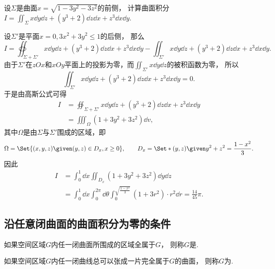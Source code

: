 \begin{example}
设\(\Sigma\)是曲面\(x = \sqrt{1-3y^2-3z^2}\)的前侧，
计算曲面积分\(I = \iint_\Sigma x \dd{y}\dd{z} + (y^3+2) \dd{z}\dd{x} + z^3 \dd{x}\dd{y}\).
\begin{solution}
设\(\Sigma'\)是平面\(x=0,3x^2+3y^2\leq1\)的后侧，
那么\begin{equation*}
	I = \oiint_{\Sigma + \Sigma'} x \dd{y}\dd{z} + (y^3+2) \dd{z}\dd{x} + z^3 \dd{x}\dd{y}
	- \iint_{\Sigma'} x \dd{y}\dd{z} + (y^3+2) \dd{z}\dd{x} + z^3 \dd{x}\dd{y}.
\end{equation*}
由于\(\Sigma'\)在\(zOx\)和\(xOy\)平面上的投影为零，而\(\iint_{\Sigma'} x \dd{y}\dd{z}\)的被积函数为零，
所以\begin{equation*}
	\iint_{\Sigma'} x \dd{y}\dd{z} + (y^3+2) \dd{z}\dd{x} + z^3 \dd{x}\dd{y} = 0.
\end{equation*}
于是由高斯公式可得\begin{align*}
	I &= \oiint_{\Sigma + \Sigma'} x \dd{y}\dd{z} + (y^3+2) \dd{z}\dd{x} + z^3 \dd{x}\dd{y} \\
	&= \iiint_\Omega (1+3y^2+3z^2) \dd{v},
\end{align*}
其中\(\Omega\)是由\(\Sigma\)与\(\Sigma'\)围成的区域，即\begin{equation*}
	\Omega = \Set{ (x,y,z) \given (y,z) \in D_x, x\geq0 },
	\qquad
	D_x = \Set*{ (y,z) \given y^2+z^2 = \frac{1-x^2}3 }.
\end{equation*}
因此\begin{align*}
	I &= \int_0^1 \dd{x} \iint_{D_x} (1+3y^2+3z^2) \dd{y}\dd{z} \\
	&= \int_0^1 \dd{x} \int_0^{2\pi} \dd\theta \int_0^{\sqrt{\frac{1-x^2}3}} (1+3r^2) \cdot r^2 \dd{r}
	= \frac{14}{45} \pi.
\end{align*}
\end{solution}
\end{example}

\subsection{沿任意闭曲面的曲面积分为零的条件}
\begin{definition}
如果空间区域\(G\)内任一闭曲面所围成的区域全属于\(G\)，
则称\(G\)是.
\end{definition}

\begin{definition}
如果空间区域\(G\)内任一闭曲线总可以张成一片完全属于\(G\)的曲面，
则称\(G\)为.
\end{definition}

